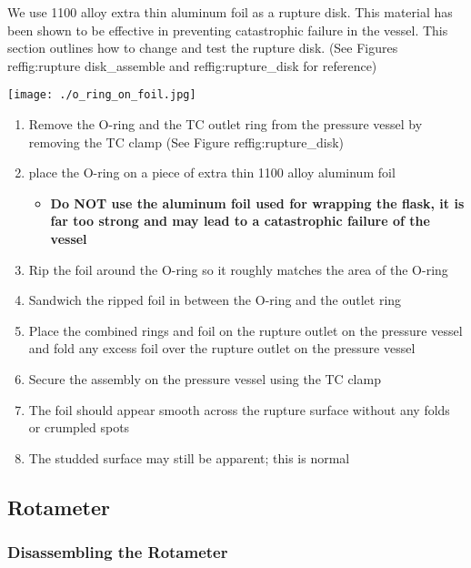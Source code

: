 We use 1100 alloy extra thin aluminum foil as a rupture disk. This
material has been shown to be effective in preventing catastrophic
failure in the vessel. This section outlines how to change and test the
rupture disk. (See Figures reffig:rupture disk\_assemble and
reffig:rupture\_disk for reference)

\texttt{[image: ./o\_ring\_on\_foil.jpg]}

\begin{enumerate}
\def\labelenumi{\arabic{enumi}.}
\item
  Remove the O-ring and the TC outlet ring from the pressure vessel by
  removing the TC clamp (See Figure reffig:rupture\_disk)
\item
  place the O-ring on a piece of extra thin 1100 alloy aluminum foil

  \begin{itemize}
  \tightlist
  \item
    \textbf{Do NOT use the aluminum foil used for wrapping the flask, it
    is far too strong and may lead to a catastrophic failure of the
    vessel}
  \end{itemize}
\item
  Rip the foil around the O-ring so it roughly matches the area of the
  O-ring
\item
  Sandwich the ripped foil in between the O-ring and the outlet ring
\item
  Place the combined rings and foil on the rupture outlet on the
  pressure vessel and fold any excess foil over the rupture outlet on
  the pressure vessel
\item
  Secure the assembly on the pressure vessel using the TC clamp
\item
  The foil should appear smooth across the rupture surface without any
  folds or crumpled spots
\item
  The studded surface may still be apparent; this is normal
\end{enumerate}

\hypertarget{rotameter}{%
\subsection{Rotameter}\label{rotameter}}

\hypertarget{disassembling-the-rotameter}{%
\subsubsection{Disassembling the
Rotameter}\label{disassembling-the-rotameter}}

